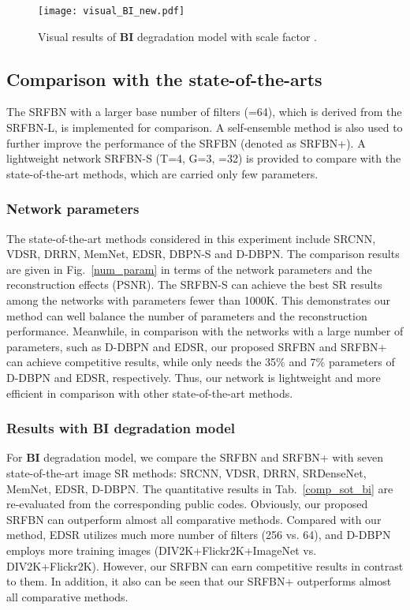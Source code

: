 \documentclass[10pt,twocolumn,letterpaper]{article}
\begin{document}
\begin{table*}[!htbp]
\end{table*}
	
	\begin{figure}[!htbp]
		\centering
		\texttt{[image: visual\_BI\_new.pdf]}
		\caption{Visual results of \textbf{BI} degradation model with scale factor .}
		\label{visual_BI}
\end{figure}

	\subsection{Comparison with the state-of-the-arts}
	The SRFBN with a larger base number of filters (=64), which is derived from the SRFBN-L, is implemented for comparison. A self-ensemble method\cite{Timofte2016Seven} is also used to further improve the performance of the SRFBN (denoted as SRFBN+). A lightweight network SRFBN-S (T=4, G=3, =32) is provided to compare with the state-of-the-art methods, which are carried only few parameters.
	
	\subsubsection{Network parameters}
	The state-of-the-art methods considered in this experiment include SRCNN\cite{dong2016image}, VDSR\cite{Kim_2016_CVPR}, DRRN\cite{Tai_2017_CVPR},  MemNet\cite{Tong_2017_ICCV}, EDSR\cite{lim2017enhanced}, DBPN-S\cite{Haris_2018_CVPR} and D-DBPN\cite{Haris_2018_CVPR}. The comparison results are given in Fig.~\ref{num_param} in terms of the network parameters and the reconstruction effects (PSNR). The SRFBN-S can achieve the best SR results among the networks with parameters fewer than 1000K. This demonstrates our method can well balance the number of parameters and the reconstruction performance. Meanwhile, in comparison with the networks with a large number of parameters, such as D-DBPN and EDSR, our proposed SRFBN and SRFBN+ can achieve competitive results, while only needs the 35\% and 7\% parameters of D-DBPN and EDSR, respectively. Thus, our network is lightweight and more efficient in comparison with other state-of-the-art methods. 
	
	\subsubsection{Results with BI degradation model}
	For \textbf{BI} degradation model, we compare the SRFBN and SRFBN+ with seven state-of-the-art image SR methods: SRCNN\cite{dong2016image}, VDSR\cite{Kim_2016_CVPR}, DRRN\cite{Tai_2017_CVPR}, SRDenseNet\cite{Tong_2017_ICCV}, MemNet\cite{Tong_2017_ICCV}, EDSR\cite{lim2017enhanced}, D-DBPN\cite{Haris_2018_CVPR}. The quantitative results in Tab.~\ref{comp_sot_bi} are re-evaluated from the corresponding public codes. Obviously, our proposed SRFBN can outperform almost all comparative methods. Compared with our method, EDSR utilizes much more number of filters (256 vs. 64), and D-DBPN employs more training images (DIV2K+Flickr2K+ImageNet vs. DIV2K+Flickr2K). However, our SRFBN can earn competitive results in contrast to them. In addition, it also can be seen that our SRFBN+ outperforms almost all comparative methods. 
	
\end{document}
